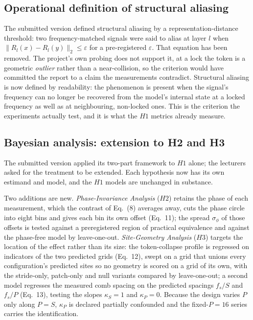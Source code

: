 \documentclass[
	letterpaper, %
	10pt, %
	unnumberedsections, %
	twoside, %
]{LTJournalArticle}
\begin{document}
\subsection{Operational definition of structural aliasing}
The submitted version defined structural aliasing by a representation-distance threshold: two
frequency-matched signals were said to alias at layer $l$ when
$\lVert R_l(x)-R_l(y)\rVert_2\le\varepsilon$ for a pre-registered $\varepsilon$. That equation has
been removed. The project's own probing does not support it, at a lock the token is a geometric
\emph{outlier} rather than a near-collision, so the criterion would have committed the report to
a claim the measurements contradict. Structural aliasing is now defined by readability: the
phenomenon is present when the signal's frequency can no longer be recovered from the model's
internal state at a locked frequency as well as at neighbouring, non-locked ones. This is the
criterion the experiments actually test, and it is what the $H1$ metrics already measure.

\subsection{Bayesian analysis: extension to H2 and H3}
The submitted version applied its two-part framework to $H1$ alone; the lecturers asked for the
treatment to be extended. Each hypothesis now has its own estimand and model, and the $H1$ models
are unchanged in substance.

Two additions are new. \emph{Phase-Invariance Analysis} ($H2$) retains the phase of each
measurement, which the contrast of Eq.~(8) averages away, cuts the phase circle into eight bins and
gives each bin its own offset (Eq.~11); the spread $\sigma_\phi$ of those offsets is tested against
a preregistered region of practical equivalence and against the phase-free model by leave-one-out.
\emph{Site-Geometry Analysis} ($H3$) targets the location of the effect rather than its size: the
token-collapse profile is regressed on indicators of the two predicted grids (Eq.~12), swept on a
grid that unions every configuration's predicted sites so no geometry is scored on a grid of its
own, with the stride-only, patch-only and null variants compared by leave-one-out; a second model
regresses the measured comb spacing on the predicted spacings $f_s/S$ and $f_s/P$ (Eq.~13), testing
the slopes $\kappa_S=1$ and $\kappa_P=0$. Because the design varies $P$ only along $P=S$,
$\kappa_P$ is declared partially confounded and the fixed-$P{=}16$ series carries the
identification.
\end{document}
